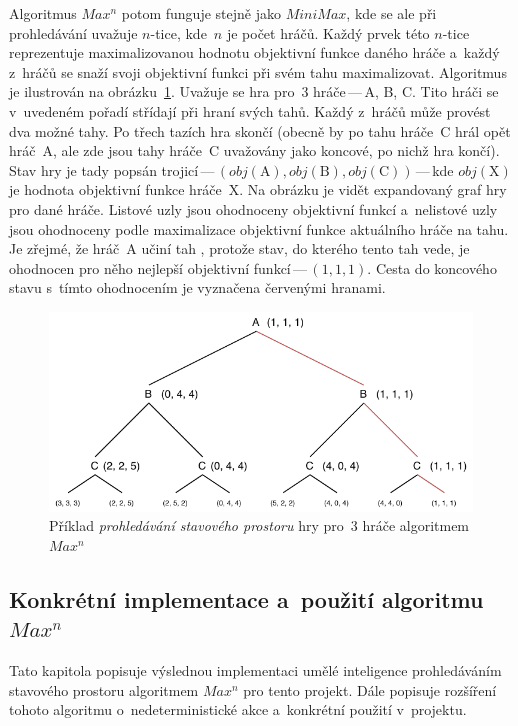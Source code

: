 \documentclass[11pt, a4paper]{article}
\theoremstyle{definition}
\begin{document}
Algoritmus $ Max^n $ potom funguje stejně jako $ MiniMax $, kde se ale
při prohledávání uvažuje $ n $-tice, kde~$ n $ je počet hráčů. Každý prvek
této $ n $-tice reprezentuje maximalizovanou hodnotu objektivní funkce
daného hráče a~každý z~hráčů se snaží svoji objektivní funkci při svém
tahu maximalizovat. Algoritmus je ilustrován na obrázku~\ref{fig:maxn}.
Uvažuje se hra pro~3 hráče\,---\,A, B, C. Tito hráči se v~uvedeném pořadí
střídají při hraní svých tahů. Každý z~hráčů může provést dva možné tahy.
Po třech tazích hra skončí (obecně by po tahu hráče~C hrál opět hráč~A,
ale zde jsou tahy hráče~C uvažovány jako koncové, po nichž hra končí).
Stav hry je tady popsán trojicí\,---\,$ (obj(\text{A}), obj(\text{B}),
obj(\text{C})) $\,---\,kde $ obj(\text{X}) $ je hodnota objektivní funkce
hráče~X. Na obrázku je vidět expandovaný graf hry pro dané hráče. Listové
uzly jsou ohodnoceny objektivní funkcí a~nelistové uzly jsou ohodnoceny
podle maximalizace objektivní funkce aktuálního hráče na tahu. Je zřejmé,
že hráč~A učiní tah , protože stav, do kterého tento tah vede,
je ohodnocen pro něho nejlepší objektivní funkcí\,---\,$ (1, 1, 1) $.
Cesta do koncového stavu s~tímto ohodnocením je vyznačena červenými hranami.

\begin{figure}[H]
    \centering
    \includegraphics[width=.8 \linewidth]{maxn.pdf}
    \caption{%
        Příklad \emph{prohledávání stavového prostoru} hry pro~3 hráče
        algoritmem $ Max^n $%
    }
    \label{fig:maxn}
\end{figure}

\subsection{\texorpdfstring{%
    Konkrétní implementace a~použití algoritmu $ Max^n $%
}{Konkrétní implementace a~použití algoritmu MaxN}}
\label{subsec:implementce-a-pouziti-algoritmu}

Tato kapitola popisuje výslednou implementaci umělé inteligence
prohledáváním stavového prostoru algoritmem $ Max^n $ pro tento projekt.
Dále popisuje rozšíření tohoto algoritmu o~nedeterministické akce
a~konkrétní použití v~projektu.
\end{document}
